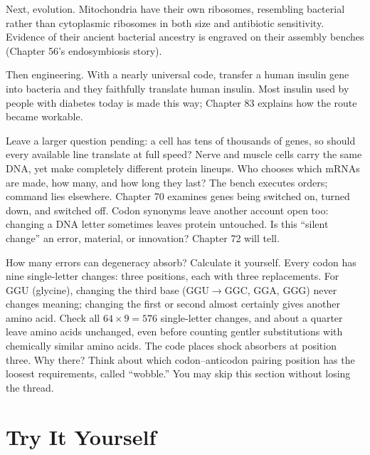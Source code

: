 Next, evolution. Mitochondria have their own ribosomes, resembling bacterial rather than cytoplasmic ribosomes in both size and antibiotic sensitivity. Evidence of their ancient bacterial ancestry is engraved on their assembly benches (Chapter 56's endosymbiosis story).

Then engineering. With a nearly universal code, transfer a human insulin gene into bacteria and they faithfully translate human insulin. Most insulin used by people with diabetes today is made this way; Chapter 83 explains how the route became workable.

Leave a larger question pending: a cell has tens of thousands of genes, so should every available line translate at full speed? Nerve and muscle cells carry the same DNA, yet make completely different protein lineups. Who chooses which mRNAs are made, how many, and how long they last? The bench executes orders; command lies elsewhere. Chapter 70 examines genes being switched on, turned down, and switched off. Codon synonyms leave another account open too: changing a DNA letter sometimes leaves protein untouched. Is this ``silent change'' an error, material, or innovation? Chapter 72 will tell.

\begin{tiaozhan}
How many errors can degeneracy absorb? Calculate it yourself. Every codon has nine single-letter changes: three positions, each with three replacements. For GGU (glycine), changing the third base (GGU$\rightarrow$GGC, GGA, GGG) never changes meaning; changing the first or second almost certainly gives another amino acid. Check all $64\times 9=576$ single-letter changes, and about a quarter leave amino acids unchanged, even before counting gentler substitutions with chemically similar amino acids. The code places shock absorbers at position three. Why there? Think about which codon--anticodon pairing position has the loosest requirements, called ``wobble.'' You may skip this section without losing the thread.
\end{tiaozhan}

\section*{Try It Yourself}

